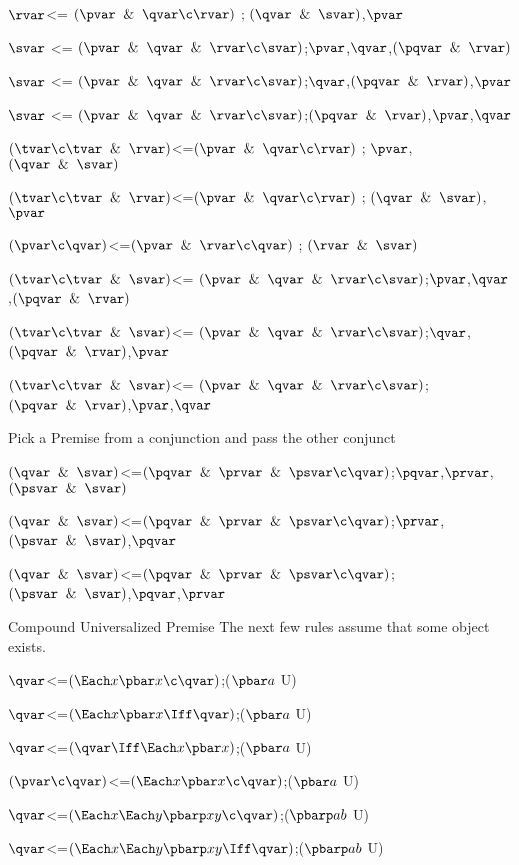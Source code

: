 $\rvar$<= $(\pvar \And \qvar \c \rvar)$ ; $(\qvar \And \svar)$,$\pvar$

$\svar$ <=  $(\pvar \And \qvar\And \rvar\c \svar)$;$\pvar$,$\qvar$,$(\pqvar \And \rvar)$

$\svar$ <=  $(\pvar \And \qvar\And \rvar\c \svar)$;$\qvar$,$(\pqvar \And \rvar)$,$\pvar$

$\svar$ <=  $(\pvar \And \qvar\And \rvar\c \svar)$;$(\pqvar \And \rvar)$,$\pvar$,$\qvar$

$(\tvar \c \tvar \And \rvar)$<=$(\pvar \And \qvar \c \rvar)$ ; $\pvar$, $(\qvar \And \svar)$

$(\tvar \c \tvar \And \rvar)$<=$(\pvar \And \qvar \c \rvar)$ ; $(\qvar \And \svar)$,$\pvar$

$(\pvar \c \qvar)$<=$(\pvar \And \rvar \c \qvar)$ ;  $(\rvar \And \svar)$

$(\tvar \c \tvar \And \svar)$<=  $(\pvar \And \qvar\And \rvar\c \svar)$;$\pvar$,$\qvar$,$(\pqvar \And \rvar)$

$(\tvar \c \tvar \And \svar)$<=  $(\pvar \And \qvar\And \rvar\c \svar)$;$\qvar$,$(\pqvar \And \rvar)$,$\pvar$

$(\tvar \c \tvar \And \svar)$<=  $(\pvar \And \qvar\And \rvar\c \svar)$;$(\pqvar \And \rvar)$,$\pvar$,$\qvar$
\lineb

Pick a Premise from a conjunction and pass the other conjunct

\lineb
$(\qvar \And \svar)$<=$(\pqvar \And \prvar \And\psvar \c \qvar)$;$\pqvar$,$\prvar$,$(\psvar \And \svar)$

$(\qvar \And \svar)$<=$(\pqvar \And \prvar \And\psvar \c \qvar)$;$\prvar$,$(\psvar \And \svar)$,$\pqvar$

$(\qvar \And \svar)$<=$(\pqvar \And \prvar \And\psvar \c \qvar)$;$(\psvar \And \svar)$,$\pqvar$,$\prvar$


Compound Universalized Premise
\lineb
The next few rules assume that some object exists.

$\qvar$<=$(\Each x \pbar x\c \qvar)$;($\pbar a$ U)

$\qvar$<=$(\Each x \pbar x\Iff \qvar)$;($\pbar a$ U)

$\qvar$<=$(\qvar \Iff \Each x \pbar x)$;($\pbar a$ U)

$(\pvar \c \qvar)$<=$(\Each x \pbar x\c \qvar)$;($\pbar a$ U)

$\qvar$<=$(\Each x \Each y \pbarp xy \c \qvar)$;($\pbarp ab$ U)

$\qvar$<=$(\Each x \Each y \pbarp xy \Iff \qvar)$;($\pbarp ab$ U)

